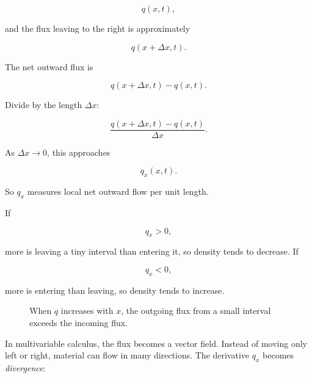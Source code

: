 \[
q(x,t),
\]

and the flux leaving to the right is approximately

\[
q(x+\Delta x,t).
\]

The net outward flux is

\[
q(x+\Delta x,t)-q(x,t).
\]

Divide by the length \(\Delta x\):

\[
\frac{q(x+\Delta x,t)-q(x,t)}{\Delta x}.
\]

As \(\Delta x\to0\), this approaches

\[
q_x(x,t).
\]

So \(q_x\) measures local net outward flow per unit length.

If

\[
q_x>0,
\]

more is leaving a tiny interval than entering it, so density tends to decrease.  If

\[
q_x<0,
\]

more is entering than leaving, so density tends to increase.

\begin{figure}[h]
\centering
{}
\caption{When \(q\) increases with \(x\), the outgoing flux from a small interval exceeds the incoming flux.}
\label{fig:flux-derivative-divergence-1d}
\end{figure}

In multivariable calculus, the flux becomes a vector field.  Instead of moving only left
or right, material can flow in many directions.  The derivative \(q_x\) becomes
\emph{divergence}:

